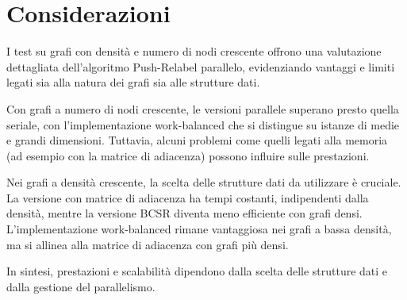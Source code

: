     \section{Considerazioni}
        I test su grafi con densità e numero di nodi crescente offrono una valutazione dettagliata dell'algoritmo Push-Relabel parallelo, evidenziando vantaggi e limiti legati sia alla natura dei grafi sia alle strutture dati.

        Con grafi a numero di nodi crescente, le versioni parallele superano presto quella seriale, con l'implementazione work-balanced che si distingue su istanze di medie e grandi dimensioni. Tuttavia, alcuni problemi come quelli legati alla memoria (ad esempio con la matrice di adiacenza) possono influire sulle prestazioni.

        Nei grafi a densità crescente, la scelta delle strutture dati da utilizzare è cruciale. La versione con matrice di adiacenza ha tempi costanti, indipendenti dalla densità, mentre la versione BCSR diventa meno efficiente con grafi densi. L'implementazione work-balanced rimane vantaggiosa nei grafi a bassa densità, ma si allinea alla matrice di adiacenza con grafi più densi.

        In sintesi, prestazioni e scalabilità dipendono dalla scelta delle strutture dati e dalla gestione del parallelismo.